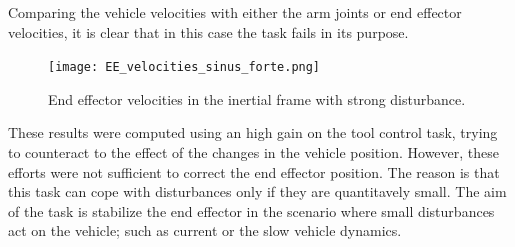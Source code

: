 \documentclass{article}
\begin{document}
Comparing the vehicle velocities with either the arm joints or end effector velocities, it is clear that in this case the task fails in its purpose. \\

\begin{figure}[H]
	\centering
	{\texttt{[image: EE\_velocities\_sinus\_forte.png]}}
	\caption{End effector velocities in the inertial frame with strong disturbance.}
	\label{im:tool_vel3}
\end{figure}

These results were computed using an high gain on the tool control task, trying to counteract to the effect of the changes in the vehicle position. However, these efforts were not sufficient to correct the end effector position. The reason is that this task can cope with disturbances only if they are quantitavely small. The aim of the task is stabilize the end effector in the scenario where small disturbances act on the vehicle; such as current or the slow vehicle dynamics. 

















\end{document}
